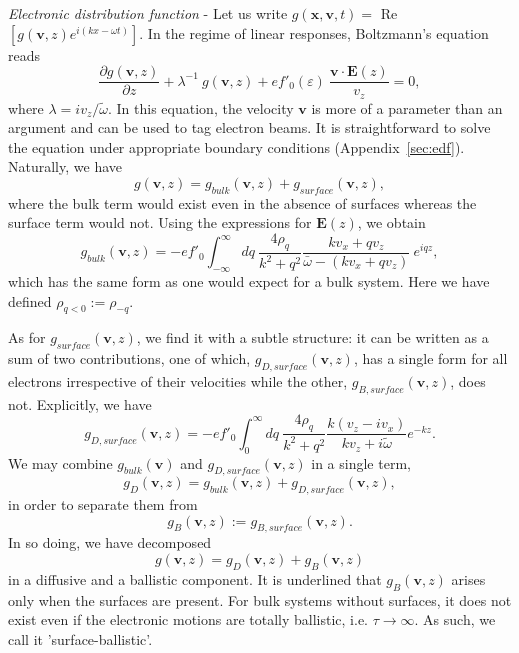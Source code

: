 \documentclass[aps,reprint]{revtex4-1}
\begin{document}
\textit{Electronic distribution function} - Let us write $g(\mathbf{x},\mathbf{v},t) = $ Re $\left[g(\mathbf{v},z)e^{i(kx-\omega t)}\right]$. In the regime of linear responses, Boltzmann's equation reads
\begin{equation}
\frac{\partial g(\mathbf{v},z)}{\partial z} + \lambda^{-1}~g(\mathbf{v},z) +
 ef'_0(\varepsilon)~\frac{\mathbf{v}\cdot\mathbf{E}(z)}{v_z} = 0,  
\label{be}
\end{equation} 
where $ \lambda = iv_z/\tilde{\omega}$. In this equation, the velocity $\mathbf{v}$ is more of a parameter than an argument and can be used to tag electron beams. It is straightforward to solve the equation under appropriate boundary conditions (Appendix~\ref{sec:edf}). Naturally, we have $$g(\mathbf{v},z) = g_{bulk}(\mathbf{v},z)+g_{surface}(\mathbf{v},z),$$ where the bulk term would exist even in the absence of surfaces whereas the surface term would not. Using the expressions for $\mathbf{E}(z)$, we obtain
\begin{equation}
g_{bulk}(\mathbf{v},z) = -ef'_0\int^{\infty}_{-\infty} dq~\frac{4\rho_q}{k^2+q^2}\frac{kv_x+qv_z}{\bar{\omega}-(kv_x+qv_z)}~e^{iqz}, \label{gbl}
\end{equation}
which has the same form as one would expect for a bulk system. Here we have defined $\rho_{q<0} := \rho_{-q}$. 

As for $g_{surface}(\mathbf{v},z)$, we find it with a subtle structure: it can be written as a sum of two contributions, one of which, $g_{D,surface}(\mathbf{v},z)$, has a single form for all electrons irrespective of their velocities while the other, $g_{B,surface}(\mathbf{v},z)$, does not. Explicitly, we have
\begin{equation}
g_{D,surface}(\mathbf{v},z) = -ef'_0\int^{\infty}_{0} dq~\frac{4\rho_q}{k^2+q^2}\frac{k(v_z-iv_x)}{kv_z+i\tilde{\omega}}e^{-kz}. \label{gd}
\end{equation}
We may combine $g_{bulk}(\mathbf{v})$ and $g_{D,surface}(\mathbf{v},z)$ in a single term, $$g_D(\mathbf{v},z) = g_{bulk}(\mathbf{v},z) + g_{D,surface}(\mathbf{v},z),$$ in order to separate them from $$g_B(\mathbf{v},z):= g_{B,surface}(\mathbf{v},z).$$ In so doing, we have decomposed $$g(\mathbf{v},z) = g_D(\mathbf{v},z)+g_B(\mathbf{v},z)$$ in a diffusive and a ballistic component. It is underlined that $g_B(\mathbf{v},z)$ arises only when the surfaces are present. For bulk systems without surfaces, it does not exist even if the electronic motions are totally ballistic, i.e. $\tau\rightarrow\infty$. As such, we call it 'surface-ballistic'. 
\end{document}
